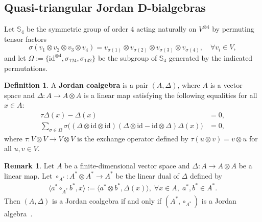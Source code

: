\documentclass[12pt, reqno, a4paper]{amsart}
\theoremstyle{definition}
\newtheorem{definition}[theorem]{Definition}
\newtheorem{remark}[theorem]{Remark}
\newcommand{\id}{\mathrm{id}}
\begin{document}
\subsection{Quasi-triangular Jordan D-bialgebras}
Let $\mathbb{S}_{4}$ be the symmetric group of order $4$ acting naturally on $V^{\otimes 4}$ by permuting tensor factors
\begin{equation*}
	\sigma (v_{1} \otimes v_{2} \otimes v_{3} \otimes v_{4}) = v_{\sigma(1)} \otimes v_{\sigma(2)} \otimes v_{\sigma(3)} \otimes v_{\sigma(4)}, \quad \forall v_{i} \in V,
\end{equation*}
and let $\Omega := \{\id^{\otimes 4}, \sigma_{124}, \sigma_{142}\}$ be the subgroup of $\mathbb{S}_{4}$ generated by the indicated permutations.



\begin{definition}
	A \textbf{Jordan coalgebra} is a pair $(A, \Delta)$, where $A$ is a vector space and $\Delta: A \to A \otimes A$ is a linear map satisfying the following equalities for all $x \in A$:
	\begin{align*}
		\tau \Delta(x) - \Delta(x) & = 0, \\
		\sum_{\sigma\in \Omega}\sigma \Big((\Delta \otimes \id \otimes \id)(\Delta \otimes \id - \id \otimes \Delta)\Delta (x)\Big) & = 0,
	\end{align*}
	where $\tau: V \otimes V \to V\otimes V$ is the exchange operator defined by $\tau(u \otimes v) = v \otimes u$ for all $u, v \in V$.
\end{definition}




\begin{remark}
	Let $A$ be a finite-dimensional vector space and $\Delta: A \to A \otimes A$ be a linear map. 
	Let $\circ_{A^*}: A^* \otimes A^* \to A^*$ be the linear dual of $\Delta$ defined by
	\begin{align*}
		\langle a^* \circ_{A^{*}} b^*, x \rangle := \langle a^* \otimes b^*, \Delta(x) \rangle,\;\forall x \in A, \; a^*,b^* \in A^{*}.
	\end{align*}
	Then $(A, \Delta)$ is a Jordan coalgebra if and only if $(A^*, \circ_{A^*})$ is a Jordan algebra~\cite[Lemma 4.4]{hou2022new}.
\end{remark}
\end{document}
